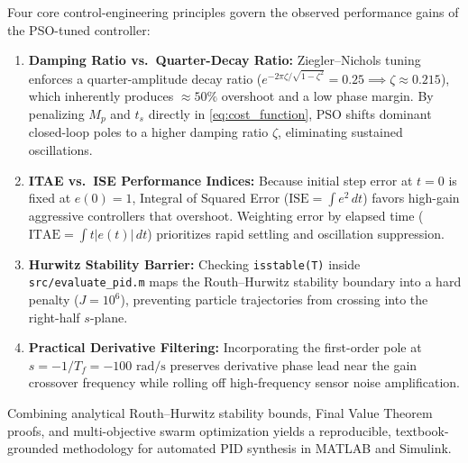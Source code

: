 \documentclass[11pt,a4paper]{article}
\begin{document}
Four core control-engineering principles govern the observed performance gains of the PSO-tuned controller:
\begin{enumerate}[leftmargin=2em]
  \item \textbf{Damping Ratio vs.\ Quarter-Decay Ratio:} Ziegler--Nichols tuning enforces a quarter-amplitude decay ratio ($e^{-2\pi\zeta/\sqrt{1-\zeta^2}} = 0.25 \implies \zeta \approx 0.215$), which inherently produces $\approx 50\%$ overshoot and a low phase margin. By penalizing $M_p$ and $t_s$ directly in \eqref{eq:cost_function}, PSO shifts dominant closed-loop poles to a higher damping ratio $\zeta$, eliminating sustained oscillations.
  \item \textbf{ITAE vs.\ ISE Performance Indices:} Because initial step error at $t = 0$ is fixed at $e(0) = 1$, Integral of Squared Error ($\text{ISE} = \int e^2\,dt$) favors high-gain aggressive controllers that overshoot. Weighting error by elapsed time ($\text{ITAE} = \int t|e(t)|\,dt$) prioritizes rapid settling and oscillation suppression.
  \item \textbf{Hurwitz Stability Barrier:} Checking \texttt{isstable(T)} inside \texttt{src/evaluate\_pid.m} maps the Routh--Hurwitz stability boundary into a hard penalty ($J = 10^6$), preventing particle trajectories from crossing into the right-half $s$-plane.
  \item \textbf{Practical Derivative Filtering:} Incorporating the first-order pole at $s = -1/T_f = -100\text{ rad/s}$ preserves derivative phase lead near the gain crossover frequency while rolling off high-frequency sensor noise amplification.
\end{enumerate}

Combining analytical Routh--Hurwitz stability bounds, Final Value Theorem proofs, and multi-objective swarm optimization yields a reproducible, textbook-grounded methodology for automated PID synthesis in MATLAB and Simulink.
\end{document}
